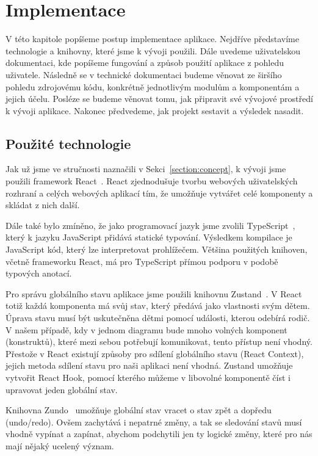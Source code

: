 \chapter{Implementace}\label{chapter:implementace}

V této kapitole popíšeme postup implementace aplikace.
Nejdříve představíme technologie a knihovny, které jsme k vývoji použili.
Dále uvedeme uživatelskou dokumentaci, kde popíšeme fungování a způsob použití aplikace z pohledu uživatele.
Následně se v technické dokumentaci budeme věnovat ze širšího pohledu zdrojovému kódu, konkrétně jednotlivým modulům a komponentám a jejich účelu.
Posléze se budeme věnovat tomu, jak připravit své vývojové prostředí k vývoji aplikace.
Nakonec předvedeme, jak projekt sestavit a výsledek nasadit.

\section{Použité technologie}

Jak už jsme ve stručnosti naznačili v Sekci~\ref{section:concept}, k vývoji jsme použili framework React~\cite{react_2023}.
React zjednodušuje tvorbu webových uživatelských rozhraní a celých webových aplikací tím, že umožňuje vytvářet celé komponenty a skládat z nich další.

Dále také bylo zmíněno, že jako programovací jazyk jsme zvolili TypeScript~\cite{microsoft_typescriptjavascript_}, který k jazyku JavaScript přidává statické typování.
Výsledkem kompilace je JavaScript kód, který lze interpretovat prohlížečem.
Většina použitých knihoven, včetně frameworku React, má pro TypeScript přímou podporu v podobě typových anotací.

Pro správu globálního stavu aplikace jsme použili knihovnu Zustand~\cite{daishikato_zustand_2019}.
V React totiž každá komponenta má svůj stav, který předává jako vlastnosti svým dětem.
Úprava stavu musí být uskutečněna dětmi pomocí události, kterou odebírá rodič.
V našem případě, kdy v jednom diagramu bude mnoho volných komponent (konstruktů), které mezi sebou potřebují komunikovat, tento přístup není vhodný.
Přestože v React existují způsoby pro sdílení globálního stavu (React Context), jejich metoda sdílení stavu pro naši aplikaci není vhodná.
Zustand umožňuje vytvořit React Hook, pomocí kterého můžeme v libovolné komponentě číst i upravovat jeden globální stav.

Knihovna Zundo~\cite{kornoelje_zundo_2021} umožňuje globální stav vracet o stav zpět a dopředu (undo/redo).
Ovšem zachytává i nepatrné změny, a tak se sledování stavů musí vhodně vypínat a zapínat, abychom podchytili jen ty logické změny, které pro nás mají nějaký ucelený význam.

